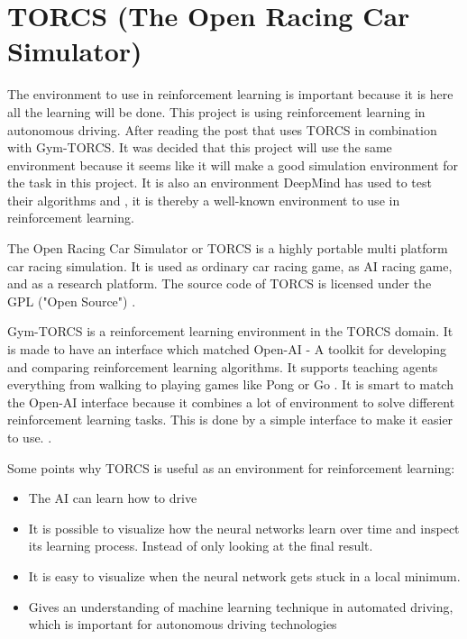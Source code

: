 \section{TORCS (The Open Racing Car Simulator)}
\label{sec:TORCS}
The environment to use in reinforcement learning is important because it is here all the learning will be done. This project is using reinforcement learning in autonomous driving. After reading the post \cite{DDPG_Torcs} that uses TORCS in combination with Gym-TORCS. It was decided that this project will use the same environment because it seems like it will make a good simulation environment for the task in this project. It is also an environment DeepMind has used to test their algorithms \cite{DBLP:journals/corr/LillicrapHPHETS15} and \cite{DBLP:journals/corr/MnihBMGLHSK16}, it is thereby a well-known environment to use in reinforcement learning. 

The Open Racing Car Simulator or TORCS is a highly portable multi platform car racing simulation. It is used as ordinary car racing game, as AI racing game, and as a research platform. The source code of TORCS is licensed under the GPL ("Open Source") \cite{TORCS_website}. 

Gym-TORCS is a reinforcement learning environment in the TORCS domain. It is made to have an interface which matched Open-AI - A toolkit for developing and comparing reinforcement learning algorithms. It supports teaching agents everything from walking to playing games like Pong or Go \cite{OPENAI_website}. It is smart to match the Open-AI interface because it combines a lot of environment to solve different reinforcement learning tasks. This is done by a simple interface to make it easier to use. \cite{Gym_TORCS_website}. 

Some points why TORCS is useful as an environment for reinforcement learning:
\begin{itemize}
	\item The AI can learn how to drive
	\item It is possible to visualize how the neural networks learn over time and inspect its learning process. Instead of only looking at the final result.
	\item It is easy to visualize when the neural network gets stuck in a local minimum.
	\item Gives an understanding of machine learning technique in automated driving, which is important for autonomous driving technologies 
\end{itemize}

